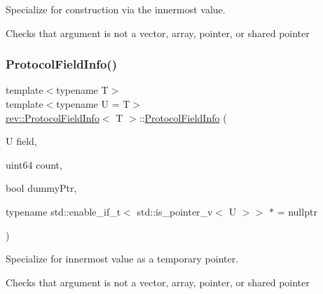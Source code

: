 Specialize for construction via the innermost value. 

Checks that argument is not a vector, array, pointer, or shared pointer \mbox{\label{structrev_1_1_protocol_field_info_ab793db9a16106b0f9dda3897d2205035}} 
\subsubsection{\texorpdfstring{ProtocolFieldInfo()}{ProtocolFieldInfo()}\hspace{0.1cm}{\footnotesize\ttfamily [2/3]}}
{\footnotesize\ttfamily template$<$typename T$>$ \\
template$<$typename U  = T$>$ \\
\mbox{\hyperlink{structrev_1_1_protocol_field_info}{rev\+::\+Protocol\+Field\+Info}}$<$ T $>$\+::\mbox{\hyperlink{structrev_1_1_protocol_field_info}{Protocol\+Field\+Info}} (\begin{DoxyParamCaption}\item[{U}]{field,  }\item[{uint64}]{count,  }\item[{bool}]{dummy\+Ptr,  }\item[{typename std\+::enable\+\_\+if\+\_\+t$<$ std\+::is\+\_\+pointer\+\_\+v$<$ U $>$$>$ $\ast$}]{ = {\ttfamily nullptr} }\end{DoxyParamCaption})\hspace{0.3cm}{\ttfamily [inline]}}



Specialize for innermost value as a temporary pointer. 

Checks that argument is not a vector, array, pointer, or shared pointer \mbox{\label{structrev_1_1_protocol_field_info_a62761a3ce30a3596139c1bcffdc8d3c5}} 
